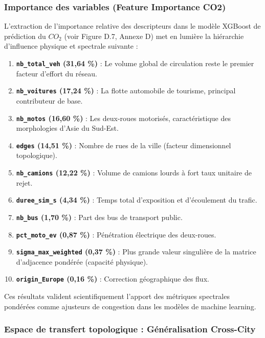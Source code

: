 \documentclass[10pt, a4paper]{article}
\providecommand{\tightlist}{}
\begin{document}
\subsubsection{Importance des variables (Feature Importance
CO2)}\label{importance-des-variables-feature-importance-co2}

L'extraction de l'importance relative des descripteurs dans le modèle
XGBoost de prédiction du \(CO_2\) (voir Figure D.7, Annexe D) met en
lumière la hiérarchie d'influence physique et spectrale suivante :

\begin{enumerate}
\def\labelenumi{\arabic{enumi}.}
\tightlist
\item
  \textbf{\texttt{nb\_total\_veh} (31,64 \%)} : Le volume global de
  circulation reste le premier facteur d'effort du réseau.
\item
  \textbf{\texttt{nb\_voitures} (17,24 \%)} : La flotte automobile de
  tourisme, principal contributeur de base.
\item
  \textbf{\texttt{nb\_motos} (16,60 \%)} : Les deux-roues motorisés,
  caractéristique des morphologies d'Asie du Sud-Est.
\item
  \textbf{\texttt{edges} (14,51 \%)} : Nombre de rues de la ville
  (facteur dimensionnel topologique).
\item
  \textbf{\texttt{nb\_camions} (12,22 \%)} : Volume de camions lourds à
  fort taux unitaire de rejet.
\item
  \textbf{\texttt{duree\_sim\_s} (4,34 \%)} : Temps total d'exposition
  et d'écoulement du trafic.
\item
  \textbf{\texttt{nb\_bus} (1,70 \%)} : Part des bus de transport
  public.
\item
  \textbf{\texttt{pct\_moto\_ev} (0,87 \%)} : Pénétration électrique des
  deux-roues.
\item
  \textbf{\texttt{sigma\_max\_weighted} (0,37 \%)} : Plus grande valeur
  singulière de la matrice d'adjacence pondérée (capacité physique).
\item
  \textbf{\texttt{origin\_Europe} (0,16 \%)} : Correction géographique
  des flux.
\end{enumerate}

Ces résultats valident scientifiquement l'apport des métriques
spectrales pondérées comme ajusteurs de congestion dans les modèles de
machine learning.

\subsubsection{Espace de transfert topologique : Généralisation
Cross-City}\label{espace-de-transfert-topologique-guxe9nuxe9ralisation-cross-city}
\end{document}
